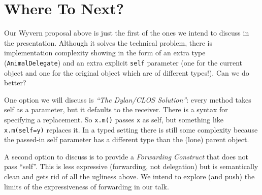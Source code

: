 \documentclass[preprint,10pt]{sigplanconf}
\begin{document}


\section{Where To Next?}



Our Wyvern proposal above is just the first of the ones we intend to discuss in the presentation.  Although it solves the technical problem, there is implementation complexity showing in the form of an extra type (\texttt{AnimalDelegate}) and an extra explicit \texttt{self} parameter (one for the current object and one for the original object which are of different types!). Can we do better?

One option we will discuss is \textit{``The Dylan/CLOS Solution''}: every method takes self as a parameter, but it defaults to the receiver. There is a syntax for specifying a replacement. So \texttt{x.m()} passes \texttt{x} as self, but something like \texttt{x.m(self=y)} replaces it. In a typed setting there is still some complexity because the passed-in self parameter has a different type than the (lone) parent object.

A second option to discuss is to provide a \textit{Forwarding Construct} that does not pass ``self''. This is less expressive (forwarding, not delegation) but is semantically clean and gets rid of all the ugliness above. We intend to explore (and push) the limits of the expressiveness of forwarding in our talk.

\end{document}
